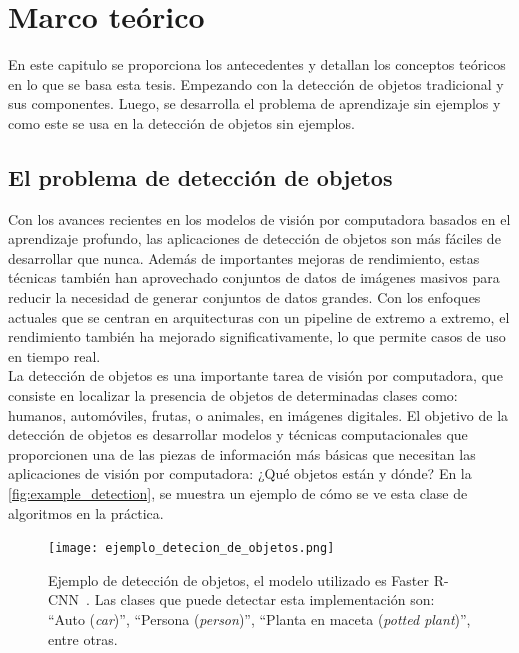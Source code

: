 \chapter{Marco teórico}\label{cap:marcoteorico}

En este capitulo se proporciona los antecedentes y detallan los conceptos teóricos en lo que se basa esta tesis. Empezando con la detección de objetos tradicional y sus componentes. Luego, se desarrolla el problema de aprendizaje sin ejemplos y como este se usa en la detección de objetos sin ejemplos. 

\section{El problema de detección de objetos} \label{sec:elproblemadedetcciondeobjetos}
Con los avances recientes en los modelos de visión por computadora basados en el aprendizaje profundo, las aplicaciones de detección de objetos son más fáciles de desarrollar que nunca. Además de importantes mejoras de rendimiento, estas técnicas también han aprovechado conjuntos de datos de imágenes masivos para reducir la necesidad de generar conjuntos de datos grandes. Con los enfoques actuales que se centran en arquitecturas con un pipeline de extremo a extremo, el rendimiento también ha mejorado significativamente, lo que permite casos de uso en tiempo real.\\


La detección de objetos es una importante tarea de visión por computadora, que consiste en localizar la presencia de objetos de determinadas clases como: humanos, automóviles, frutas, o animales, en imágenes digitales. El objetivo de la detección de objetos es desarrollar modelos y técnicas computacionales que proporcionen una de las piezas de información más básicas que necesitan las aplicaciones de visión por computadora: ¿Qué objetos están y dónde? En la \autoref{fig:example_detection}, se muestra un ejemplo de cómo se ve esta clase de algoritmos en la práctica.\\

\begin{figure}
	\centering
	\texttt{[image: ejemplo\_detecion\_de\_objetos.png]}
	\caption{Ejemplo de detección de objetos, el modelo utilizado es Faster R-CNN~\cite{ren2015faster}. Las clases que puede detectar esta implementación son: ``Auto (\textit{car})'',  ``Persona (\textit{person})'',  ``Planta en maceta (\textit{potted plant})'', entre otras.}
	\label{fig:example_detection}
\end{figure}

